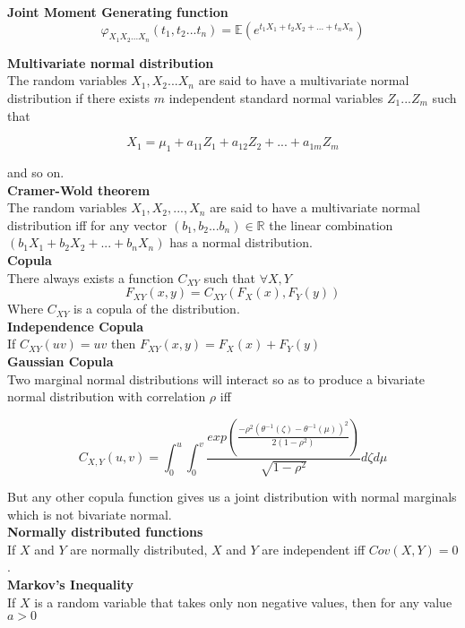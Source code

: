 \textbf{Joint Moment Generating function}\\
$$\varphi_{X_1 X_2 ...X_n}(t_1,t_2...t_n) = \mathbb{E}(e^{t_1X_1 + t_2X_2+ ... + t_nX_n})$$

\textbf{Multivariate normal distribution}\\
The random variables $X_1,X_2...X_n$ are said to have a multivariate normal distribution if there exists $m$ independent standard normal variables $Z_1...Z_m$ such that

$$X_1 = \mu_1 + a_{11}Z_1 + a_{12}Z_2 + ... + a_{1m}Z_m$$

and so on.\\

\textbf{Cramer-Wold theorem}\\
The random variables $X_1,X_2,..., X_n$ are said to have a multivariate normal distribution iff for any vector $(b_1,b_2...b_n) \in \mathbb{R}$ the linear combination $(b_1X_1 + b_2X_2 + ... + b_nX_n)$ has a normal distribution.\\

\textbf{Copula}\\
There always exists a function $C_{XY}$ such that $\forall X,Y$\\

$$F_{XY}(x,y) = C_{XY}(F_X(x),F_Y(y))$$
Where $C_{XY}$ is a copula of the distribution.\\

\textbf{Independence Copula}\\
If $C_{XY}(uv) = uv$ then $F_{XY}(x,y) = F_{X}(x) +F_Y(y)$\\

\textbf{Gaussian Copula}\\
Two marginal normal distributions will interact so as to produce a bivariate normal distribution with correlation $\rho$ iff 

$$C_{X,Y}(u,v) = \int_0^u \int_0^v \frac{exp(\frac{-\rho^2 (\theta^{-1}(\zeta) - \theta^{-1}(\mu))^2}{2(1-\rho^2)})}{\sqrt{1-\rho^2}} d\zeta d\mu$$	

But any other copula function gives us a joint distribution with normal marginals which is not bivariate normal.\\

\textbf{Normally distributed functions}\\

If $X$ and $Y$ are normally distributed, $X$ and $Y$ are independent iff $Cov(X,Y) = 0$.\\

\textbf{Markov's Inequality}\\
If $X$ is a random variable that takes only non negative values, then for any value $a >0$

